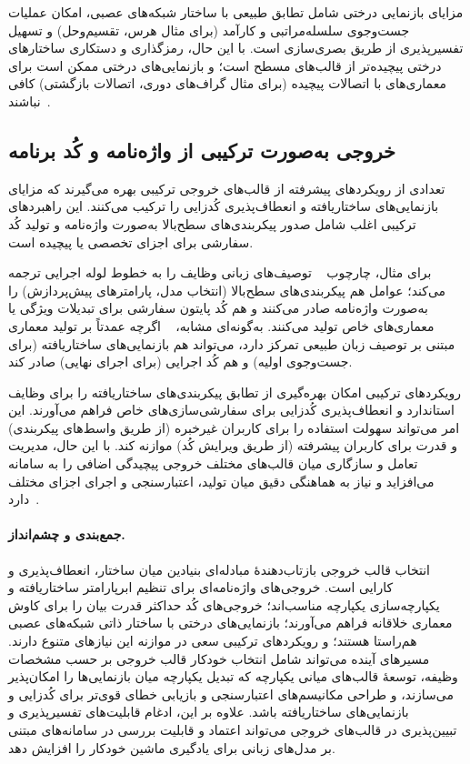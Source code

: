 مزایای بازنمایی درختی شامل تطابق طبیعی با ساختار شبکه‌های عصبی، امکان عملیات جست‌وجوی سلسله‌مراتبی و کارآمد (برای مثال هرس، تقسیم‌وحل) و تسهیل تفسیرپذیری از طریق بصری‌سازی است. با این حال، رمزگذاری و دستکاری ساختارهای درختی پیچیده‌تر از قالب‌های مسطح است؛ و بازنمایی‌های درختی ممکن است برای معماری‌های با اتصالات پیچیده (برای مثال گراف‌های دوری، اتصالات بازگشتی) کافی نباشند~\cite{Yang2025NADER}.

\subsection{خروجی به‌صورت ترکیبی از واژه‌نامه و کُد برنامه}
تعدادی از رویکردهای پیشرفته از قالب‌های خروجی ترکیبی بهره می‌گیرند که مزایای بازنمایی‌های ساختاریافته و انعطاف‌پذیری کُدزایی را ترکیب می‌کنند. این راهبردهای ترکیبی اغلب شامل صدور پیکربندی‌های سطح‌بالا به‌صورت واژه‌نامه و تولید کُد سفارشی برای اجزای تخصصی یا پیچیده است.

برای مثال، چارچوب ~\cite{xu2024largeTextToML} توصیف‌های زبانی وظایف را به خطوط لوله اجرایی ترجمه می‌کند؛ عوامل هم پیکربندی‌های سطح‌بالا (انتخاب مدل، پارامترهای پیش‌پردازش) را به‌صورت واژه‌نامه صادر می‌کنند و هم کُد پایتون سفارشی برای تبدیلات ویژگی یا معماری‌های خاص تولید می‌کنند. به‌گونه‌ای مشابه، ~\cite{zheng2023GENIUS} اگرچه عمدتاً بر تولید معماری مبتنی بر توصیف زبان طبیعی تمرکز دارد، می‌تواند هم بازنمایی‌های ساختاریافته (برای جست‌وجوی اولیه) و هم کُد اجرایی (برای اجرای نهایی) صادر کند.

رویکردهای ترکیبی امکان بهره‌گیری از تطابق پیکربندی‌های ساختاریافته را برای وظایف استاندارد و انعطاف‌پذیری کُدزایی برای سفارشی‌سازی‌های خاص فراهم می‌آورند. این امر می‌تواند سهولت استفاده را برای کاربران غیرخبره (از طریق واسط‌های پیکربندی) و قدرت برای کاربران پیشرفته (از طریق ویرایش کُد) موازنه کند. با این حال، مدیریت تعامل و سازگاری میان قالب‌های مختلف خروجی پیچیدگی اضافی را به سامانه می‌افزاید و نیاز به هماهنگی دقیق میان تولید، اعتبارسنجی و اجرای اجزای مختلف دارد~\cite{xu2024largeTextToML,zheng2023GENIUS}.

\paragraph{جمع‌بندی و چشم‌انداز.}
انتخاب قالب خروجی بازتاب‌دهندهٔ مبادله‌ای بنیادین میان ساختار، انعطاف‌پذیری و کارایی است. خروجی‌های واژه‌نامه‌ای برای تنظیم ابرپارامتر ساختاریافته و یکپارچه‌سازی یکپارچه مناسب‌اند؛ خروجی‌های کُد حداکثر قدرت بیان را برای کاوش معماری خلاقانه فراهم می‌آورند؛ بازنمایی‌های درختی با ساختار ذاتی شبکه‌های عصبی هم‌راستا هستند؛ و رویکردهای ترکیبی سعی در موازنه این نیازهای متنوع دارند. مسیرهای آینده می‌تواند شامل انتخاب خودکار قالب خروجی بر حسب مشخصات وظیفه، توسعهٔ قالب‌های میانی یکپارچه که تبدیل یکپارچه میان بازنمایی‌ها را امکان‌پذیر می‌سازند، و طراحی مکانیسم‌های اعتبارسنجی و بازیابی خطای قوی‌تر برای کُدزایی و بازنمایی‌های ساختاریافته باشد. علاوه بر این، ادغام قابلیت‌های تفسیرپذیری و تبیین‌پذیری در قالب‌های خروجی می‌تواند اعتماد و قابلیت بررسی در سامانه‌های مبتنی بر مدل‌های زبانی برای یادگیری ماشین خودکار را افزایش دهد.
